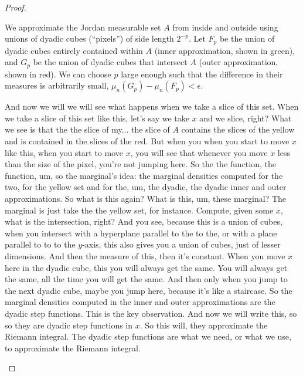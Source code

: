 \begin{proof}
\begin{math-stroke}
\begin{center}
\end{center}
\begin{explanation-of-steps}
We approximate the Jordan measurable set $A$ from inside and outside using unions of dyadic cubes (``pixels'') of side length $2^{-p}$. Let $F_p$ be the union of dyadic cubes entirely contained within $A$ (inner approximation, shown in green), and $G_p$ be the union of dyadic cubes that intersect $A$ (outer approximation, shown in red). We can choose $p$ large enough such that the difference in their measures is arbitrarily small, $\mu_n(G_p) - \mu_n(F_p) < \epsilon$.
\end{explanation-of-steps}
\end{math-stroke}

\begin{spoken-clean}[00:04:31 - 00:05:20]
And now we will we will see what happens when we take a slice of this set. When we take a slice of this set like this, let's say we take $x$ and we slice, right? What we see is that the the slice of my... the slice of $A$ contains the slices of the yellow and is contained in the slices of the red. But when you when you start to move $x$ like this, when you start to move $x$, you will see that whenever you move $x$ less than the size of the pixel, you're not jumping here. So the the function, the function, um, so the marginal's idea: the marginal densities computed for the two, for the yellow set and for the, um, the dyadic, the dyadic inner and outer approximations. So what is this again? What is this, um, these marginal? The marginal is just take the the yellow set, for instance. Compute, given some $x$, what is the intersection, right? And you see, because this is a union of cubes, when you intersect with a hyperplane parallel to the to the, or with a plane parallel to to to the $y$-axis, this also gives you a union of cubes, just of lesser dimensions. And then the measure of this, then it's constant. When you move $x$ here in the dyadic cube, this you will always get the same. You will always get the same, all the time you will get the same. And then only when you jump to the next dyadic cube, maybe you jump here, because it's like a staircase. So the marginal densities computed in the inner and outer approximations are the dyadic step functions. This is the key observation. And now we will write this, so so they are dyadic step functions in $x$. So this will, they approximate the Riemann integral. The dyadic step functions are what we need, or what we use, to approximate the Riemann integral.
\end{spoken-clean}


\end{proof}

